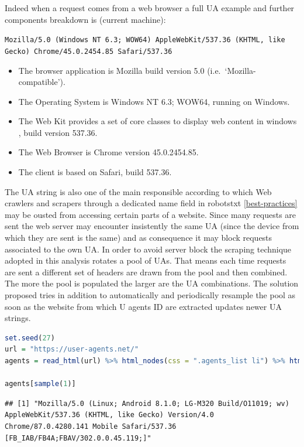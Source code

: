 \documentclass[
  12pt,
  a4paper,
  oneside]{book}
\newcommand{\passthrough}[1]{#1}
\providecommand{\tightlist}{%
  \setlength{\itemsep}{0pt}\setlength{\parskip}{0pt}}
\theoremstyle{definition}
\theoremstyle{definition}
\theoremstyle{definition}
\theoremstyle{remark}
\begin{document}
Indeed when a request comes from a web browser a full UA example and further components breakdown is (current machine):

\passthrough{\lstinline!Mozilla/5.0 (Windows NT 6.3; WOW64) AppleWebKit/537.36 (KHTML, like Gecko) Chrome/45.0.2454.85 Safari/537.36!}

\begin{itemize}
\tightlist
\item
  The browser application is Mozilla build version 5.0 (i.e.~`Mozilla-compatible').
\item
  The Operating System is Windows NT 6.3; WOW64, running on Windows.
\item
  The Web Kit provides a set of core classes to display web content in windows \citep{UserAgen23}, build version 537.36.
\item
  The Web Browser is Chrome version 45.0.2454.85.
\item
  The client is based on Safari, build 537.36.
\end{itemize}

The UA string is also one of the main responsible according to which Web crawlers and scrapers through a dedicated name field in robotstxt \ref{best-practices} may be ousted from accessing certain parts of a website. Since many requests are sent the web server may encounter insistently the same UA (since the device from which they are sent is the same) and as consequence it may block requests associated to the own UA. In order to avoid server block the scraping technique adopted in this analysis rotates a pool of UAs. That means each time requests are sent a different set of headers are drawn from the pool and then combined. The more the pool is populated the larger are the UA combinations. The solution proposed tries in addition to automatically and periodically resample the pool as soon as the website from which U agents ID are extracted updates newer UA strings.

\begin{lstlisting}[language=R]
set.seed(27)
url = "https://user-agents.net/"
agents = read_html(url) %>% html_nodes(css = ".agents_list li") %>% html_text()

agents[sample(1)]
\end{lstlisting}

\begin{lstlisting}
## [1] "Mozilla/5.0 (Linux; Android 8.1.0; LG-M320 Build/O11019; wv) AppleWebKit/537.36 (KHTML, like Gecko) Version/4.0 Chrome/87.0.4280.141 Mobile Safari/537.36 [FB_IAB/FB4A;FBAV/302.0.0.45.119;]"
\end{lstlisting}
\end{document}
